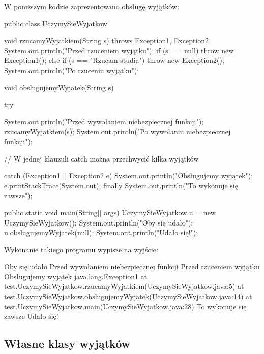 \begin{example}
    W poniższym kodzie zaprezentowano obsługę wyjątków:
    \begin{java}
        public class UczymySieWyjatkow {
            void rzucamyWyjatkiem(String s) throws Exception1, Exception2 {
                System.out.println("Przed rzuceniem wyjątku");
                if (s == null) 
                    throw new Exception1();
                else if (s == "Rzucam studia")
                    throw new Exception2();
                System.out.println("Po rzuceniu wyjątku");
            }
    
            void obslugujemyWyjatek(String s) {
                try {
                    System.out.println("Przed wywołaniem niebezpiecznej funkcji");
                    rzucamyWyjatkiem(s);
                    System.out.println("Po wywołaniu niebezpiecznej funkcji");
                    
                // W jednej klauzuli catch można przechwycić kilka wyjątków
                } catch (Exception1 || Exception2 e) {
                    System.out.println("Obsługujemy wyjątek");
                    e.printStackTrace(System.out);
                } finally {
                    System.out.println("To wykonuje się zawsze");
                }
            }
    
            public static void main(String[] args) {
                UczymySieWyjatkow u = new UczymySieWyjatkow();
                System.out.println("Oby się udało");
                u.obslugujemyWyjatek(null);
                System.out.println("Udało się!");
            }
        }
    \end{java}

    Wykonanie takiego programu wypisze na wyjście:
    \begin{java}
        Oby się udało
        Przed wywołaniem niebezpiecznej funkcji
        Przed rzuceniem wyjątku
        Obsługujemy wyjątek
        java.lang.Exception1
            at test.UczymySieWyjatkow.rzucamyWyjatkiem(UczymySieWyjatkow.java:5) 
            at test.UczymySieWyjatkow.obslugujemyWyjatek(UczymySieWyjatkow.java:14) 
            at test.UczymySieWyjatkow.main(UczymySieWyjatkow.java:28)
        To wykonuje się zawsze
        Udało się!
    \end{java}
\end{example}

\subsection{Własne klasy wyjątków}

